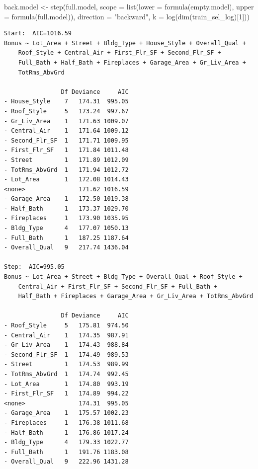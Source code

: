 \documentclass[
  letterpaper,
  DIV=11,
  numbers=noendperiod]{scrreprt}
\newenvironment{Shaded}{\begin{snugshade}}{\end{snugshade}}
\newcommand{\AttributeTok}[1]{\textcolor[rgb]{0.40,0.45,0.13}{#1}}
\newcommand{\DecValTok}[1]{\textcolor[rgb]{0.68,0.00,0.00}{#1}}
\newcommand{\FunctionTok}[1]{\textcolor[rgb]{0.28,0.35,0.67}{#1}}
\newcommand{\NormalTok}[1]{\textcolor[rgb]{0.00,0.23,0.31}{#1}}
\newcommand{\OtherTok}[1]{\textcolor[rgb]{0.00,0.23,0.31}{#1}}
\newcommand{\StringTok}[1]{\textcolor[rgb]{0.13,0.47,0.30}{#1}}
\begin{document}
\begin{Shaded}
\begin{Highlighting}[]
\NormalTok{back.model }\OtherTok{\textless{}{-}} \FunctionTok{step}\NormalTok{(full.model,}
                   \AttributeTok{scope =} \FunctionTok{list}\NormalTok{(}\AttributeTok{lower =} \FunctionTok{formula}\NormalTok{(empty.model),}
                                \AttributeTok{upper =} \FunctionTok{formula}\NormalTok{(full.model)),}
                   \AttributeTok{direction =} \StringTok{"backward"}\NormalTok{, }\AttributeTok{k =} \FunctionTok{log}\NormalTok{(}\FunctionTok{dim}\NormalTok{(train\_sel\_log)[}\DecValTok{1}\NormalTok{]))}
\end{Highlighting}
\end{Shaded}

\begin{verbatim}
Start:  AIC=1016.59
Bonus ~ Lot_Area + Street + Bldg_Type + House_Style + Overall_Qual + 
    Roof_Style + Central_Air + First_Flr_SF + Second_Flr_SF + 
    Full_Bath + Half_Bath + Fireplaces + Garage_Area + Gr_Liv_Area + 
    TotRms_AbvGrd

                Df Deviance     AIC
- House_Style    7   174.31  995.05
- Roof_Style     5   173.24  997.67
- Gr_Liv_Area    1   171.63 1009.07
- Central_Air    1   171.64 1009.12
- Second_Flr_SF  1   171.71 1009.95
- First_Flr_SF   1   171.84 1011.48
- Street         1   171.89 1012.09
- TotRms_AbvGrd  1   171.94 1012.72
- Lot_Area       1   172.08 1014.43
<none>               171.62 1016.59
- Garage_Area    1   172.50 1019.38
- Half_Bath      1   173.37 1029.70
- Fireplaces     1   173.90 1035.95
- Bldg_Type      4   177.07 1050.13
- Full_Bath      1   187.25 1187.64
- Overall_Qual   9   217.74 1436.04

Step:  AIC=995.05
Bonus ~ Lot_Area + Street + Bldg_Type + Overall_Qual + Roof_Style + 
    Central_Air + First_Flr_SF + Second_Flr_SF + Full_Bath + 
    Half_Bath + Fireplaces + Garage_Area + Gr_Liv_Area + TotRms_AbvGrd

                Df Deviance     AIC
- Roof_Style     5   175.81  974.50
- Central_Air    1   174.35  987.91
- Gr_Liv_Area    1   174.43  988.84
- Second_Flr_SF  1   174.49  989.53
- Street         1   174.53  989.99
- TotRms_AbvGrd  1   174.74  992.45
- Lot_Area       1   174.80  993.19
- First_Flr_SF   1   174.89  994.22
<none>               174.31  995.05
- Garage_Area    1   175.57 1002.23
- Fireplaces     1   176.38 1011.68
- Half_Bath      1   176.86 1017.24
- Bldg_Type      4   179.33 1022.77
- Full_Bath      1   191.76 1183.08
- Overall_Qual   9   222.96 1431.28


\end{verbatim}
\end{document}
